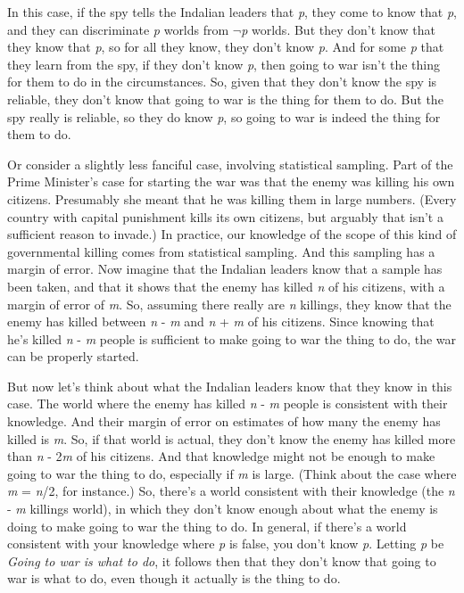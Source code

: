 In this case, if the spy tells the Indalian leaders that \textit{p}, they come to know that \textit{p}, and they can discriminate \textit{p} worlds from \(\neg\)\textit{p} worlds. But they don't know that they know that \textit{p}, so for all they know, they don't know \textit{p}. And for some \textit{p} that they learn from the spy, if they don't know \textit{p}, then going to war isn't the thing for them to do in the circumstances. So, given that they don't know the spy is reliable, they don't know that going to war is the thing for them to do. But the spy really is reliable, so they do know \textit{p}, so going to war is indeed the thing for them to do.

Or consider a slightly less fanciful case, involving statistical sampling. Part of the Prime Minister's case for starting the war was that the enemy was killing his own citizens. Presumably she meant that he was killing them in large numbers. (Every country with capital punishment kills its own citizens, but arguably that isn't a sufficient reason to invade.) In practice, our knowledge of the scope of this kind of governmental killing comes from statistical sampling. And this sampling has a margin of error. Now imagine that the Indalian leaders know that a sample has been taken, and that it shows that the enemy has killed \textit{n} of his citizens, with a margin of error of \textit{m}. So, assuming there really are \textit{n} killings, they know that the enemy has killed between \textit{n} - \textit{m} and \textit{n} + \textit{m} of his citizens. Since knowing that he's killed \textit{n} - \textit{m} people is sufficient to make going to war the thing to do, the war can be properly started. 

But now let's think about what the Indalian leaders know that they know in this case. The world where the enemy has killed \textit{n} - \textit{m} people is consistent with their knowledge. And their margin of error on estimates of how many the enemy has killed is \textit{m}. So, if that world is actual, they don't know the enemy has killed more than \textit{n} - 2\textit{m} of his citizens. And that knowledge might not be enough to make going to war the thing to do, especially if \textit{m} is large. (Think about the case where \textit{m} = \textit{n}/2, for instance.) So, there's a world consistent with their knowledge (the \textit{n} - \textit{m} killings world), in which they don't know enough about what the enemy is doing to make going to war the thing to do. In general, if there's a world consistent with your knowledge where \textit{p} is false, you don't know \textit{p}. Letting \textit{p} be \textit{Going to war is what to do}, it follows then that they don't know that going to war is what to do, even though it actually is the thing to do.

